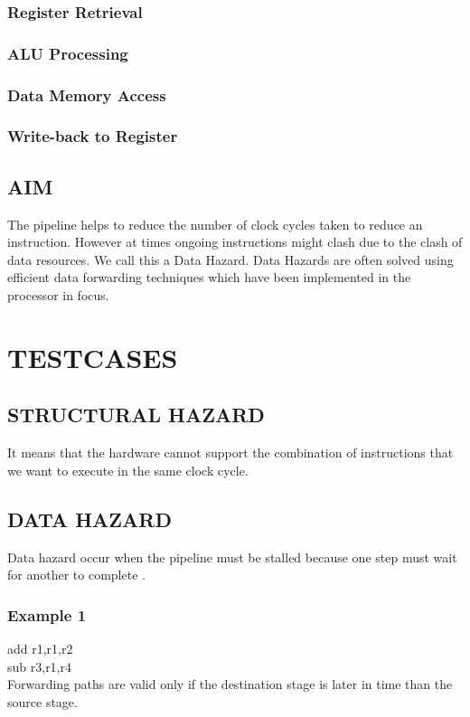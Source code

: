 \documentclass{scrreprt}
\begin{document}
\subsection{Register Retrieval}
\subsection{ALU Processing}
\subsection{Data Memory Access}
\subsection{Write-back to Register}


\section{AIM}
The pipeline helps to reduce the number of clock cycles taken to reduce an instruction. However at times ongoing instructions might clash due to the clash of data resources. We call this a Data Hazard. Data Hazards are often solved using efficient data forwarding techniques which have been implemented in the processor in focus.
\chapter{TESTCASES}
\section{STRUCTURAL HAZARD}
It means that the hardware cannot support the combination of instructions that we want to execute in the same clock cycle.

\section{DATA HAZARD}
Data hazard occur when the pipeline must be stalled because one step must wait for another to complete .
\subsection{Example 1}
add r1,r1,r2\\
sub r3,r1,r4\\

Forwarding paths are valid only if the destination stage is later in time than the source stage.\\
\end{document}

